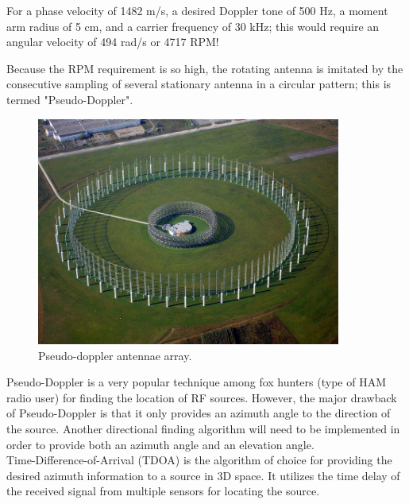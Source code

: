 \documentclass[12pt]{article}
\begin{document}
\noindent For a phase velocity of 1482 m/s, a desired Doppler tone of 500 Hz, a moment arm radius of 5 cm, and a carrier frequency of 30 kHz; this would require an angular velocity of 494 rad/s or 4717 RPM!

\pagebreak

\noindent Because the RPM requirement is so high, the rotating antenna is imitated by the  consecutive sampling of several stationary antenna in a circular pattern; this is termed "Pseudo-Doppler".

\vspace{5mm}
    
\begin{figure}[!h]
	\centering
	\includegraphics[width=10.0cm]{Pics_and_Figs/Pseudo_Doppler_Antennae_Array.png}
    \caption{Pseudo-doppler antennae array.} \label{fig:Doppler Array}
\end{figure}

\noindent Pseudo-Doppler is a very popular technique among fox hunters (type of HAM radio user) for finding the location of RF sources. However, the major drawback of Pseudo-Doppler is that it only provides an azimuth angle to the direction of the source. Another directional finding algorithm will need to be implemented in order to provide both an azimuth angle and an elevation angle.\\

\noindent Time-Difference-of-Arrival (TDOA) is the algorithm of choice for providing the desired azimuth information to a source in 3D space. It utilizes the time delay of the received signal from multiple sensors for locating the source.\\
\end{document}
